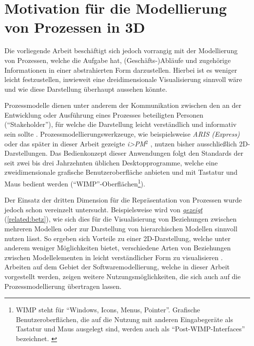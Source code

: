 \documentclass[a4paper,10pt]{sphinxmanual}
\begin{document}
\section{Motivation für die Modellierung von Prozessen in 3D}
\label{einleitung:motivation-fur-die-modellierung-von-prozessen-in-3d}
Die vorliegende Arbeit beschäftigt sich jedoch vorrangig mit der Modellierung von Prozessen, welche die Aufgabe hat, (Geschäfts-)Abläufe und zugehörige Informationen in einer abstrahierten Form darzustellen.
Hierbei ist es weniger leicht festzustellen, inwieweit eine dreidimensionale Visualisierung sinnvoll wäre und wie diese Darstellung überhaupt aussehen könnte.

Prozessmodelle dienen unter anderem der Kommunikation zwischen den an der Entwicklung oder Ausführung eines Prozesses beteiligten Personen ("`Stakeholder"'), für welche die Darstellung leicht verständlich und informativ sein sollte \cite{brown_conceptual_2010}.
Prozessmodellierungswerkzeuge, wie beispielsweise \emph{ARIS (Express)} \cite{scheer_aris_2000} oder das später in dieser Arbeit gezeigte \emph{i\textgreater{}PM}$^{\text{2}}$ \cite{roth_konzeption_2011}, nutzen bisher ausschließlich 2D-Darstellungen.
Das Bedienkonzept dieser Anwendungen folgt den Standards der seit zwei bis drei Jahrzehnten üblichen Desktopprogramme, welche eine zweidimensionale grafische Benutzeroberfläche anbieten und mit Tastatur und Maus bedient werden ("`WIMP"'-Oberflächen\footnote{
WIMP steht für "`Windows, Icons, Menus, Pointer"'. Grafische Benutzeroberflächen, die auf die Nutzung mit anderen Eingabegeräte als Tastatur und Maus ausgelegt sind, werden auch als "`Post-WIMP-Interfaces"' bezeichnet. \cite{van_dam_post-wimp_1997}
}).

Der Einsatz der dritten Dimension für die Repräsentation von Prozessen wurde jedoch schon vereinzelt untersucht.
Beispielsweise wird von \cite{betz_3d_2008} {\hyperref[related:betz]{\emph{gezeigt}}} (\autoref*{related:betz}), wie sich dies für die Visualisierung von Beziehungen zwischen mehreren Modellen oder zur Darstellung von hierarchischen Modellen sinnvoll nutzen lässt.
So ergeben sich Vorteile zu einer 2D-Darstellung, welche unter anderem weniger Möglichkeiten bietet, verschiedene Arten von Beziehungen zwischen Modellelementen in leicht verständlicher Form zu visualisieren \cite{gil_three_1998}.
Arbeiten auf dem Gebiet der Softwaremodellierung, welche in dieser Arbeit vorgestellt werden, zeigen weitere Nutzungsmöglichkeiten, die sich auch auf die Prozessmodellierung übertragen lassen.
\end{document}
